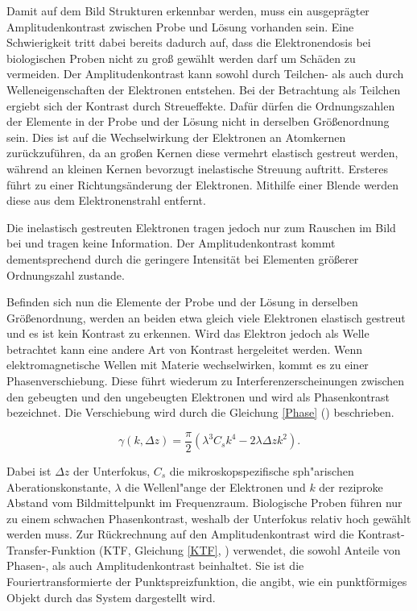 Damit auf dem Bild Strukturen erkennbar werden, muss ein ausgeprägter Amplitudenkontrast zwischen Probe und Lösung vorhanden sein.
Eine Schwierigkeit tritt dabei bereits dadurch auf, dass die Elektronendosis bei biologischen Proben nicht zu groß gewählt werden darf um Schäden zu vermeiden.
Der Amplitudenkontrast kann sowohl durch Teilchen- als auch durch Welleneigenschaften der Elektronen entstehen. 
Bei der Betrachtung als Teilchen ergiebt sich der Kontrast durch Streueffekte.
Dafür dürfen die Ordnungszahlen der Elemente in der Probe und der Lösung nicht in derselben Größenordnung sein.
Dies ist auf die Wechselwirkung der Elektronen an Atomkernen zurückzuführen, da an großen Kernen diese vermehrt elastisch gestreut werden, während an kleinen Kernen bevorzugt inelastische Streuung auftritt.
Ersteres führt zu einer Richtungsänderung der Elektronen.
Mithilfe einer Blende werden diese aus dem Elektronenstrahl entfernt.

Die inelastisch gestreuten Elektronen tragen jedoch nur zum Rauschen im Bild bei und tragen keine Information.
Der Amplitudenkontrast kommt dementsprechend durch die geringere Intensität bei Elementen größerer Ordnungszahl zustande.

Befinden sich nun die Elemente der Probe und der Lösung in derselben Größenordnung, werden an beiden etwa gleich viele Elektronen elastisch gestreut und es ist kein Kontrast zu erkennen.
Wird das Elektron jedoch als Welle betrachtet kann eine andere Art von Kontrast hergeleitet werden.
Wenn elektromagnetische Wellen mit Materie wechselwirken, kommt es zu einer Phasenverschiebung.
Diese führt wiederum zu Interferenzerscheinungen zwischen den gebeugten und den ungebeugten Elektronen und wird als Phasenkontrast bezeichnet.
Die Verschiebung wird durch die Gleichung \eqref{Phase} (\cite{scherzer}) beschrieben.

\begin{equation}
	\gamma(k,\Delta z) = \frac{\pi}{2}\left(\lambda^3 C_s k^4 - 2\lambda \Delta z k^2\right). \label{Phase}
\end{equation}

Dabei ist $\Delta z$ der Unterfokus, $C_s$ die mikroskopspezifische sph"arischen Aberationskonstante, $\lambda$ die Wellenl"ange der Elektronen und $k$ der reziproke Abstand vom Bildmittelpunkt im Frequenzraum.
Biologische Proben führen nur zu einem schwachen Phasenkontrast, weshalb der Unterfokus relativ hoch gewählt werden muss.
Zur Rückrechnung auf den Amplitudenkontrast wird die Kontrast-Transfer-Funktion (KTF, Gleichung \eqref{KTF}, \cite{zhu}) verwendet, die sowohl Anteile von Phasen-, als auch Amplitudenkontrast beinhaltet.
Sie ist die Fouriertransformierte der Punktspreizfunktion, die angibt, wie ein punktförmiges Objekt durch das System dargestellt wird.

